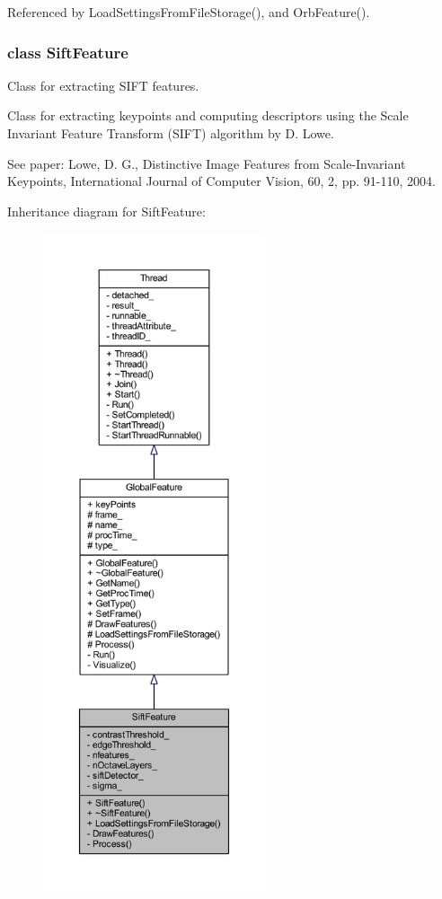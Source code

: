 Referenced by Load\-Settings\-From\-File\-Storage(), and Orb\-Feature().

\label{class_sift_feature}
\hypertarget{group___feature_extractor_class_sift_feature}{}
\subsubsection{class Sift\-Feature}
Class for extracting S\-I\-F\-T features. 

Class for extracting keypoints and computing descriptors using the Scale Invariant Feature Transform (S\-I\-F\-T) algorithm by D. Lowe.

See paper\-: Lowe, D. G., \-Distinctive Image Features from Scale-\/\-Invariant Keypoints, International Journal of Computer Vision, 60, 2, pp. 91-\/110, 2004. 

Inheritance diagram for Sift\-Feature\-:
\nopagebreak
\begin{figure}[H]
\begin{center}
\leavevmode
\includegraphics[height=550pt]{class_sift_feature__inherit__graph}
\end{center}
\end{figure}


